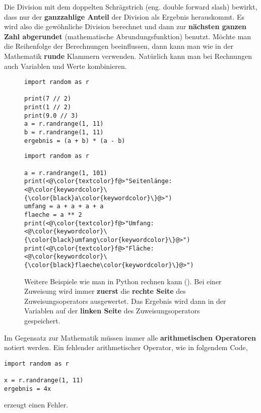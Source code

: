 Die Division mit dem doppelten Schrägstrich (eng. double forward slash) bewirkt, dass nur der \textbf{ganzzahlige Anteil} der Division als Ergebnis herauskommt. Es wird also die gewöhnliche Division berechnet und dann zur \textbf{nächsten ganzen Zahl abgerundet} (mathematische Abrundungsfunktion) benutzt. Möchte man die Reihenfolge der Berechnungen beeinflussen, dann kann man wie in der Mathematik \textbf{runde} Klammern verwenden. Natürlich kann man bei Rechnungen auch Variablen und Werte kombinieren.

\begin{figure}[htb]
\centering
\begin{minipage}{0.5\textwidth}
\centering
\begin{lstlisting}
import random as r

print(7 // 2)
print(1 // 2)
print(9.0 // 3)
a = r.randrange(1, 11)
b = r.randrange(1, 11)
ergebnis = (a + b) * (a - b)
\end{lstlisting}
\end{minipage}
\hfill
\begin{minipage}{0.45\textwidth}
\centering
\begin{lstlisting}
import random as r

a = r.randrange(1, 101)
print(<@\color{textcolor}f@>"Seitenlänge: <@\color{keywordcolor}\{\color{black}a\color{keywordcolor}\}@>")
umfang = a + a + a + a
flaeche = a ** 2
print(<@\color{textcolor}f@>"Umfang: <@\color{keywordcolor}\{\color{black}umfang\color{keywordcolor}\}@>")
print(<@\color{textcolor}f@>"Fläche: <@\color{keywordcolor}\{\color{black}flaeche\color{keywordcolor}\}@>")\end{lstlisting}
\end{minipage}
\caption{Weitere Beispiele wie man in Python rechnen kann (). Bei einer Zuweisung wird immer \textbf{zuerst} die \textbf{rechte Seite} des Zuweisungsoperators ausgewertet. Das Ergebnis wird dann in der Variablen auf der \textbf{linken Seite} des Zuweisungsoperators gespeichert.}
\label{lst-calc-print-2}
\end{figure}

\begin{important}
	Im Gegensatz zur Mathematik müssen immer alle \textbf{arithmetischen Operatoren} notiert werden. Ein fehlender arithmetischer Operator, wie in folgendem Code,
	
\begin{lstlisting}
import random as r
		
x = r.randrange(1, 11)
ergebnis = 4x
\end{lstlisting}

erzeugt einen Fehler.

\end{important}

